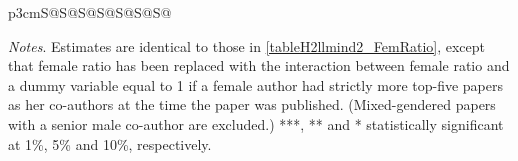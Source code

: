 \begin{table}
\begin{threeparttable}
\begin{tabular}{p{3cm}S@{}S@{}S@{}S@{}S@{}S@{}S@{}}
        \end{tabular}
        \begin{tablenotes}
            \tiny
            \item \textit{Notes}. Estimates are identical to those in \autoref{tableH2llmind2_FemRatio}, except that female ratio has been replaced with the interaction between female ratio and a dummy variable equal to 1 if a female author had strictly more top-five papers as her co-authors at the time the paper was published. (Mixed-gendered papers with a senior male co-author are excluded.) ***, ** and * statistically significant at 1\%, 5\% and 10\%, respectively.
        \end{tablenotes}
    \end{threeparttable}
\end{table}